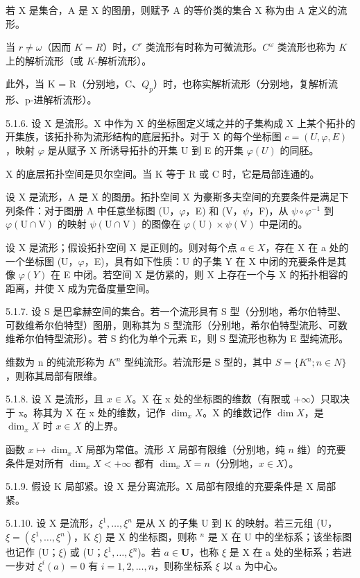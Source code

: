 若 X 是集合，A 是 X 的图册，则赋予 A 的等价类的集合 X 称为由 A 定义的流形。

当 \(r \neq \omega\)（因而 \(K = R\)）时，\(C^r\) 类流形有时称为可微流形。\(C^\omega\) 类流形也称为 \(K\) 上的解析流形（或 \(K\)-解析流形）。

此外，当 K = R（分别地，C、\(Q_{p}\)）时，也称实解析流形（分别地，复解析流形、p-进解析流形）。

5.1.6. 设 X 是流形。X 中作为 X 的坐标图定义域之并的子集构成 X 上某个拓扑的开集族，该拓扑称为流形结构的底层拓扑。对于 X 的每个坐标图 \(c = (U, \varphi, E)\)，映射 \(\varphi\) 是从赋予 X 所诱导拓扑的开集 U 到 E 的开集 \(\varphi(U)\) 的同胚。

X 的底层拓扑空间是贝尔空间。当 K 等于 R 或 C 时，它是局部连通的。

设 X 是流形，A 是 X 的图册。拓扑空间 X 为豪斯多夫空间的充要条件是满足下列条件：对于图册 A 中任意坐标图 (U，\(\varphi\)，E) 和 (V，\(\psi\)，F)，从 \(\psi \circ \varphi^{-1}\) 到 \(\varphi(\mathrm{U} \cap \mathrm{V})\) 的映射 \(\psi(\mathrm{U} \cap \mathrm{V})\) 的图像在 \(\varphi(\mathrm{U}) \times \psi(\mathrm{V})\) 中是闭的。

设 X 是流形；假设拓扑空间 X 是正则的。则对每个点 \(a \in X\)，存在 X 在 a 处的一个坐标图 (U，\(\varphi\)，E)，具有如下性质：U 的子集 Y 在 X 中闭的充要条件是其像 \(\varphi(Y)\) 在 E 中闭。若空间 X 是仿紧的，则 X 上存在一个与 X 的拓扑相容的距离，并使 X 成为完备度量空间。

5.1.7. 设 S 是巴拿赫空间的集合。若一个流形具有 S 型（分别地，希尔伯特型、可数维希尔伯特型）图册，则称其为 S 型流形（分别地，希尔伯特型流形、可数维希尔伯特型流形）。若 S 约化为单个元素 E，则 S 型流形也称为 E 型纯流形。

维数为 n 的纯流形称为 \(K^{n}\) 型纯流形。若流形是 S 型的，其中 \(S = \{K^{n}; n \in N\}\)，则称其局部有限维。

5.1.8. 设 X 是流形，且 \(x \in X\)。X 在 x 处的坐标图的维数（有限或 \(+\infty\)）只取决于 x。称其为 X 在 x 处的维数，记作 \(\dim_{x}X\)。X 的维数记作 \(\dim X\)，是 \(\dim_{x}X\) 时 \(x \in X\) 的上界。

函数 \(x \mapsto \dim_x X\) 局部为常值。流形 \(X\) 局部有限维（分别地，纯 \(n\) 维）的充要条件是对所有 \(\dim_x X < +\infty\) 都有 \(\dim_x X = n\)（分别地，\(x \in X\)）。

5.1.9. 假设 K 局部紧。设 X 是分离流形。X 局部有限维的充要条件是 X 局部紧。

5.1.10. 设 X 是流形，\(\xi^{1},\ldots,\xi^{n}\) 是从 X 的子集 U 到 K 的映射。若三元组 (U，\(\xi=(\xi^{1},\ldots,\xi^{n})\)，K \(\xi\)) 是 X 的坐标图，则称 \(^{n}\) 是 X 在 U 中的坐标系；该坐标图也记作 (U；\(\xi\)) 或 (U；\(\xi^{1},\ldots,\xi^{n}\))。若 \(a\in\mathbf{U}\)，也称 \(\xi\) 是 X 在 a 处的坐标系；若进一步对 \(\xi^{i}(a)=0\) 有 \(i=1,2,\ldots,n\)，则称坐标系 \(\xi\) 以 a 为中心。

